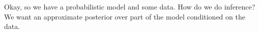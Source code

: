 
  Okay, so we have a probabilistic model and some data.  How do we do
  inference?  We want an approximate posterior over part of the model
  conditioned on the data.
